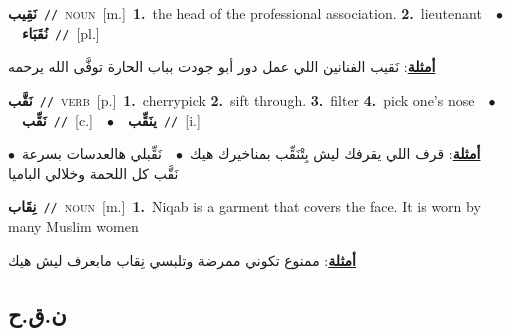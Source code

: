 \documentclass[10pt,a4paper,twoside]{article} %
\begin{document}
\begin{multicols}{2}
{\setlength\topsep{0pt}\textbf{\foreignlanguage{arabic}{نَقِيب}}\ {\color{gray}\texttt{//}\color{black}}\ \textsc{noun}\ [m.]\ \textbf{1.}~the head of the professional association.  \textbf{2.}~lieutenant\ \ $\bullet$\ \ \setlength\topsep{0pt}\textbf{\foreignlanguage{arabic}{نُقَبَاء}}\ {\color{gray}\texttt{//}\color{black}}\ [pl.]\  \begin{flushright}\color{gray}\foreignlanguage{arabic}{\textbf{\underline{\foreignlanguage{arabic}{أمثلة}}}: نَقيب الفنانين اللي عمل دور أبو جودت بباب الحارة توفَّى الله يرحمه}\end{flushright}\color{black}} \vspace{2mm}

{\setlength\topsep{0pt}\textbf{\foreignlanguage{arabic}{نَقَّب}}\ {\color{gray}\texttt{//}\color{black}}\ \textsc{verb}\ [p.]\ \textbf{1.}~cherrypick  \textbf{2.}~sift through.  \textbf{3.}~filter  \textbf{4.}~pick one's nose\ \ $\bullet$\ \ \setlength\topsep{0pt}\textbf{\foreignlanguage{arabic}{نَقِّب}}\ {\color{gray}\texttt{//}\color{black}}\ [c.]\ \ $\bullet$\ \ \setlength\topsep{0pt}\textbf{\foreignlanguage{arabic}{ينَقِّب}}\ {\color{gray}\texttt{//}\color{black}}\ [i.]\  \begin{flushright}\color{gray}\foreignlanguage{arabic}{\textbf{\underline{\foreignlanguage{arabic}{أمثلة}}}: قرف اللي يقرفك ليش بِتْنَقِّب بمناخيرك هيك\ $\bullet$\ \  نَقِّبلي هالعدسات بسرعة\ $\bullet$\ \  نَقَّب كل اللحمة وخلالي الباميا}\end{flushright}\color{black}} \vspace{2mm}

{\setlength\topsep{0pt}\textbf{\foreignlanguage{arabic}{نِقَاب}}\ {\color{gray}\texttt{//}\color{black}}\ \textsc{noun}\ [m.]\ \textbf{1.}~Niqab  is a garment that covers the face. It is worn by many Muslim women\  \begin{flushright}\color{gray}\foreignlanguage{arabic}{\textbf{\underline{\foreignlanguage{arabic}{أمثلة}}}: ممنوع تكوني ممرضة وتلبسي نِقاب مابعرف ليش هيك}\end{flushright}\color{black}} \vspace{2mm}

\vspace{-3mm}
\subsection*{\color{blue}\foreignlanguage{arabic}{ن.ق.ح}\color{blue}{}} 


\end{multicols}
\end{document}
